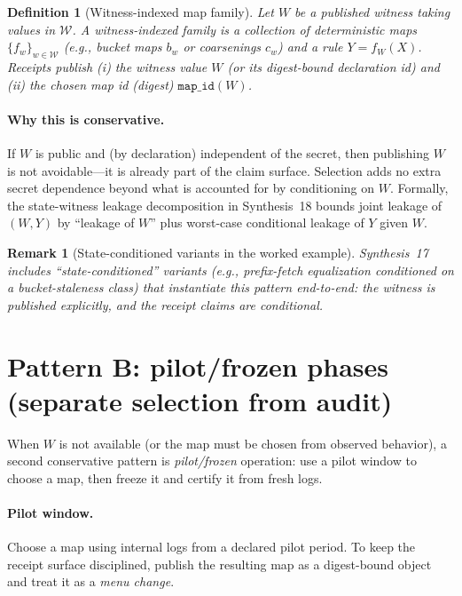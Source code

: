 \documentclass[11pt]{article}
\newtheorem{definition}{Definition}
\newtheorem{remark}{Remark}
\begin{document}
\begin{definition}[Witness-indexed map family]
Let $W$ be a published witness taking values in $\mathcal W$.
A \emph{witness-indexed family} is a collection of deterministic maps $\{f_w\}_{w\in\mathcal W}$
(e.g., bucket maps $b_w$ or coarsenings $c_w$) and a rule $Y=f_W(X)$.
Receipts publish (i) the witness value $W$ (or its digest-bound declaration id) and (ii) the chosen map id (digest) $\texttt{map\_id}(W)$.
\end{definition}

\paragraph{Why this is conservative.}
If $W$ is public and (by declaration) independent of the secret,
then publishing $W$ is not avoidable---it is already part of the claim surface.
Selection adds no extra secret dependence beyond what is accounted for by conditioning on $W$.
Formally, the state-witness leakage decomposition in Synthesis~18 bounds joint leakage of $(W,Y)$ by
``leakage of $W$'' plus worst-case conditional leakage of $Y$ given $W$.\cite{series:planstate}

\begin{remark}[State-conditioned variants in the worked example]
Synthesis~17 includes ``state-conditioned'' variants (e.g., prefix-fetch equalization conditioned on a bucket-staleness class)
that instantiate this pattern end-to-end: the witness is published explicitly, and the receipt claims are conditional.\cite{series:workedexample}
\end{remark}

\section{Pattern B: pilot/frozen phases (separate selection from audit)}
When $W$ is not available (or the map must be chosen from observed behavior),
a second conservative pattern is \emph{pilot/frozen} operation:
use a pilot window to choose a map, then freeze it and certify it from fresh logs.

\paragraph{Pilot window.}
Choose a map using internal logs from a declared pilot period.
To keep the receipt surface disciplined, publish the resulting map as a digest-bound object and treat it as a \emph{menu change}.
\end{document}
